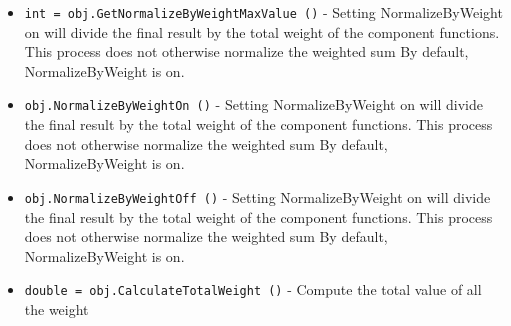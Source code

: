 \begin{itemize}
\item  \verb|int = obj.GetNormalizeByWeightMaxValue ()| -  Setting NormalizeByWeight on will divide the
 final result by the total weight of the component functions.
 This process does not otherwise normalize the weighted sum
 By default, NormalizeByWeight is on.

\item  \verb|obj.NormalizeByWeightOn ()| -  Setting NormalizeByWeight on will divide the
 final result by the total weight of the component functions.
 This process does not otherwise normalize the weighted sum
 By default, NormalizeByWeight is on.

\item  \verb|obj.NormalizeByWeightOff ()| -  Setting NormalizeByWeight on will divide the
 final result by the total weight of the component functions.
 This process does not otherwise normalize the weighted sum
 By default, NormalizeByWeight is on.

\item  \verb|double = obj.CalculateTotalWeight ()| -  Compute the total value of all the weight

\end{itemize}
